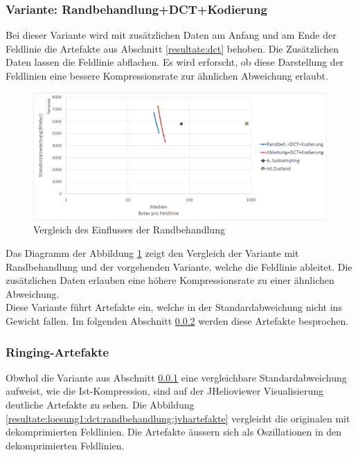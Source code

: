 \subsubsection{Variante: Randbehandlung+DCT+Kodierung} \label{resultate:loesung1:dct:randbeh+byte}
Bei dieser Variante wird mit zusätzlichen Daten am Anfang und am Ende der Feldlinie die Artefakte aus Abschnitt \ref{resultate:dct} behoben. Die Zusätzlichen Daten lassen die Feldlinie abflachen. Es wird erforscht, ob diese Darstellung der Feldlinien eine bessere Kompressionsrate zur ähnlichen Abweichung erlaubt. 

\begin{figure}[!htbp]
	\center	\includegraphics[width=1\textwidth,keepaspectratio]{./pictures/resultate/loesung1/loesung1-7/loesung1_7.png}
	\caption{Vergleich des Einflusses der Randbehandlung}
	\label{resultate:loesung1:dct:randbehandlung}
\end{figure}
Das Diagramm der Abbildung \ref{resultate:loesung1:dct:randbehandlung} zeigt den Vergleich der Variante mit Randbehandlung und der vorgehenden Variante, welche die Feldlinie ableitet. Die zusätzlichen Daten erlauben eine höhere Kompressionsrate zu einer ähnlichen Abweichung.\\
Diese Variante führt Artefakte ein, welche in der Standardabweichung nicht ins Gewicht fallen. Im folgenden Abschnitt \ref{resultate:loesung1:ringing} werden diese Artefakte besprochen.

\subsubsection{Ringing-Artefakte}\label{resultate:loesung1:ringing}
Obwhol die Variante aus Abschnitt \ref{resultate:loesung1:dct:randbeh+byte} eine vergleichbare Standardabweichung aufweist, wie die Ist-Kompression, sind auf der JHelioviewer Visualisierung deutliche Artefakte zu sehen. Die Abbildung \ref{resultate:loesung1:dct:randbehandlung:jvhartefakte} vergleicht die originalen mit dekomprimierten Feldlinien. Die Artefakte äussern sich als Oszillationen in den dekomprimierten Feldlinien.

